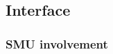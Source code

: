 \subsection{Interface}
\label{Design_Service_Interface}

\subsubsection{SMU involvement}
\label{Design_Service_Interface_SMU}